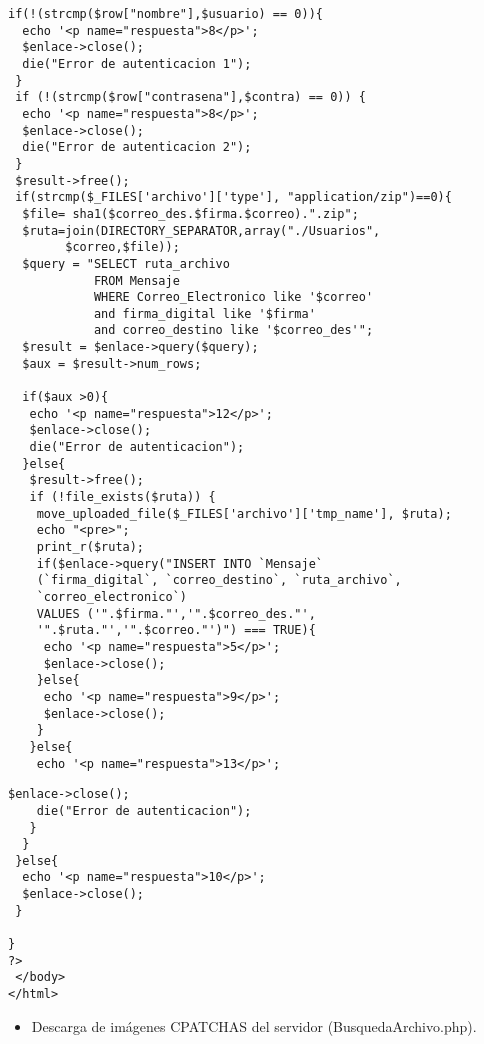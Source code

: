 \begin{lstlisting}[frame=single]
 if(!(strcmp($row["nombre"],$usuario) == 0)){
  echo '<p name="respuesta">8</p>';
  $enlace->close();
  die("Error de autenticacion 1");
 }
 if (!(strcmp($row["contrasena"],$contra) == 0)) {
  echo '<p name="respuesta">8</p>';
  $enlace->close();
  die("Error de autenticacion 2");
 }
 $result->free();
 if(strcmp($_FILES['archivo']['type'], "application/zip")==0){
  $file= sha1($correo_des.$firma.$correo).".zip";
  $ruta=join(DIRECTORY_SEPARATOR,array("./Usuarios",
        $correo,$file));
  $query = "SELECT ruta_archivo 
            FROM Mensaje 
            WHERE Correo_Electronico like '$correo' 
            and firma_digital like '$firma' 
            and correo_destino like '$correo_des'";
  $result = $enlace->query($query);
  $aux = $result->num_rows;

  if($aux >0){
   echo '<p name="respuesta">12</p>';
   $enlace->close();
   die("Error de autenticacion");
  }else{
   $result->free();
   if (!file_exists($ruta)) {
    move_uploaded_file($_FILES['archivo']['tmp_name'], $ruta);
    echo "<pre>";
    print_r($ruta);
    if($enlace->query("INSERT INTO `Mensaje`
    (`firma_digital`, `correo_destino`, `ruta_archivo`, 
    `correo_electronico`) 
    VALUES ('".$firma."','".$correo_des."',
    '".$ruta."','".$correo."')") === TRUE){
     echo '<p name="respuesta">5</p>';
     $enlace->close();
    }else{
     echo '<p name="respuesta">9</p>';
     $enlace->close();
    }
   }else{
    echo '<p name="respuesta">13</p>';
\end{lstlisting}
\begin{lstlisting}[frame=single]
    $enlace->close();
    die("Error de autenticacion");
   }
  }
 }else{
  echo '<p name="respuesta">10</p>';
  $enlace->close();
 }

}
?>
 </body>
</html>
 \end{lstlisting}
\begin{itemize}
\item Descarga de imágenes CPATCHAS del servidor (BusquedaArchivo.php).
\end{itemize}

